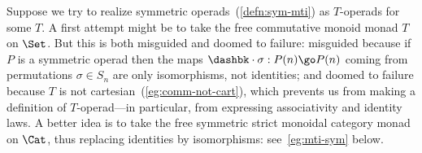 \begin{example}	
Suppose we try to realize symmetric operads~(\ref{defn:sym-mti})%
%
%
%
%
as
$T$-operads for some $T$.  A first attempt might be to take the free
commutative monoid monad $T$ on $\Set$. But this is both misguided and
doomed to failure: misguided because if $P$ is a symmetric operad then the
maps $\dashbk\cdot\sigma: P(n) \go P(n)$ coming from permutations
$\sigma\in S_n$ are only isomorphisms, not%
%
%
identities; and doomed to
failure because $T$ is not cartesian~(\ref{eg:comm-not-cart}), which
prevents us from making a definition of $T$-operad---in particular, from
expressing associativity and identity laws.  A better idea is to take the
free symmetric%
%
%
strict monoidal category monad on $\Cat$, thus replacing
identities by isomorphisms: see~\ref{eg:mti-sym} below.
\end{example}

